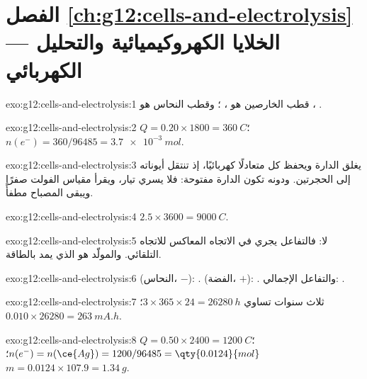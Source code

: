 \section*{الفصل \ref{ch:g12:cells-and-electrolysis} --- الخلايا الكهروكيميائية والتحليل الكهربائي}

\begin{solution}{exo:g12:cells-and-electrolysis:1}
قطب الخارصين هو ، ؛ وقطب النحاس
هو ، .
\end{solution}

\begin{solution}{exo:g12:cells-and-electrolysis:2}
$Q = 0.20 \times 1800 = \qty{360}{C}$؛ $n(e^-) = 360/96485 =
\qty{3.7e-3}{mol}$.
\end{solution}

\begin{solution}{exo:g12:cells-and-electrolysis:3}
يغلق الدارة ويحفظ كل  متعادلًا كهربائيًا، إذ تنتقل
أيوناته إلى الحجرتين. ودونه تكون الدارة مفتوحة: فلا
يسري تيار، ويقرأ مقياس الفولت صفرًا ويبقى المصباح مطفأً.
\end{solution}

\begin{solution}{exo:g12:cells-and-electrolysis:4}
$2.5 \times 3600 = \qty{9000}{C}$.
\end{solution}

\begin{solution}{exo:g12:cells-and-electrolysis:5}
لا: فالتفاعل يجري في الاتجاه المعاكس للاتجاه التلقائي.
والمولّد هو الذي يمد بالطاقة.
\end{solution}

\begin{solution}{exo:g12:cells-and-electrolysis:6}
 (النحاس، $-$): .  (الفضة، $+$):
. والتفاعل الإجمالي: .
\end{solution}

\begin{solution}{exo:g12:cells-and-electrolysis:7}
ثلاث سنوات تساوي $3 \times 365 \times 24 = \qty{26280}{h}$؛
$0.010 \times 26280 = \qty{263}{mA.h}$.
\end{solution}

\begin{solution}{exo:g12:cells-and-electrolysis:8}
$Q = 0.50 \times 2400 = \qty{1200}{C}$؛ $n(e^-) = n(\ce{Ag}) =
1200/96485 = \qty{0.0124}{mol}$؛ $m = 0.0124 \times 107.9 =
\qty{1.34}{g}$.
\end{solution}

